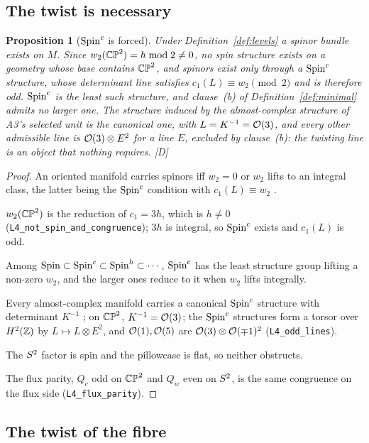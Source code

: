 \documentclass[11pt,a4paper]{article}
\theoremstyle{plain}
\newtheorem{proposition}[theorem]{Proposition}
\theoremstyle{definition}
\theoremstyle{remark}
\newcommand{\rigD}{[\textup{D}]}
\begin{document}
\subsection{The twist is necessary}

\begin{proposition}[$\text{Spin}^c$ is forced]\label{prop:spinc}
Under Definition~\ref{def:levels} a spinor bundle exists on $M$. Since $w_{2}(\mathbb{CP}^2)=h\bmod2\neq0$, no spin structure exists on a geometry whose base contains $\mathbb{CP}^2$, and spinors exist only through a $\text{Spin}^c$ structure, whose determinant line satisfies $c_{1}(L)\equiv w_{2}\pmod2$ and is therefore odd. $\text{Spin}^c$ is the least such structure, and clause~(b) of Definition~\ref{def:minimal} admits no larger one. The structure induced by the almost-complex structure of A3's selected unit is the canonical one, with $L=K^{-1}=\mathcal{O}(3)$, and every other admissible line is $\mathcal{O}(3)\otimes E^{2}$ for a line $E$, excluded by clause~(b): the twisting line is an object that nothing requires. \rigD
\end{proposition}

\begin{proof}
An oriented manifold carries spinors iff $w_{2}=0$ or $w_{2}$ lifts to an integral class, the latter being the $\text{Spin}^c$ condition with $c_{1}(L)\equiv w_{2}$ \cite{LawsonMichelsohn}.

$w_{2}(\mathbb{CP}^2)$ is the reduction of $c_{1}=3h$, which is $h\neq0$ (\texttt{L4\_not\_spin\_and\_congruence}); $3h$ is integral, so $\text{Spin}^c$ exists and $c_{1}(L)$ is odd.

Among $\mathrm{Spin}\subset\text{Spin}^c\subset\mathrm{Spin}^{h}\subset\cdots$, $\text{Spin}^c$ has the least structure group lifting a non-zero $w_{2}$, and the larger ones reduce to it when $w_{2}$ lifts integrally.

Every almost-complex manifold carries a canonical $\text{Spin}^c$ structure with determinant $K^{-1}$ \cite{LawsonMichelsohn,Friedrich}; on $\mathbb{CP}^2$, $K^{-1}=\mathcal{O}(3)$; the $\text{Spin}^c$ structures form a torsor over $H^{2}(\mathbb{Z})$ by $L\mapsto L\otimes E^{2}$, and $\mathcal{O}(1),\mathcal{O}(5)$ are $\mathcal{O}(3)\otimes\mathcal{O}(\mp1)^{2}$ (\texttt{L4\_odd\_lines}).

The $S^2$ factor is spin and the pillowcase is flat, so neither obstructs.

The flux parity, $Q_{c}$ odd on $\mathbb{CP}^2$ and $Q_{w}$ even on $S^2$, is the same congruence on the flux side (\texttt{L4\_flux\_parity}).
\end{proof}

\subsection{The twist of the fibre}\label{sec:twist}
\end{document}
